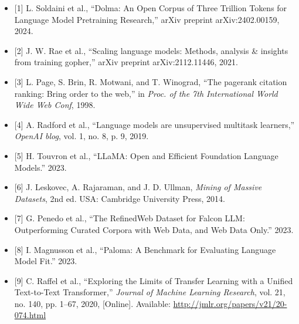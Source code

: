 \begin{itemize}
  \item {[1]} L. Soldaini et al., ``Dolma: An Open Corpus of Three Trillion Tokens for Language Model Pretraining Research,'' arXiv preprint arXiv:2402.00159, 2024.
  \item {[2]} J. W. Rae et al., ``Scaling language models: Methods, analysis \& insights from training gopher,'' arXiv preprint arXiv:2112.11446, 2021.
  \item {[3]} L. Page, S. Brin, R. Motwani, and T. Winograd, ``The pagerank citation ranking: Bring order to the web,'' in \textit{Proc. of the 7th International World Wide Web Conf}, 1998.
  \item {[4]} A. Radford et al., ``Language models are unsupervised multitask learners,'' \textit{OpenAI blog}, vol. 1, no. 8, p. 9, 2019.
  \item {[5]} H. Touvron et al., ``LLaMA: Open and Efficient Foundation Language Models.'' 2023.
  \item {[6]} J. Leskovec, A. Rajaraman, and J. D. Ullman, \textit{Mining of Massive Datasets}, 2nd ed. USA: Cambridge University Press, 2014.
  \item {[7]} G. Penedo et al., ``The RefinedWeb Dataset for Falcon LLM: Outperforming Curated Corpora with Web Data, and Web Data Only.'' 2023.
  \item {[8]} I. Magnusson et al., ``Paloma: A Benchmark for Evaluating Language Model Fit.'' 2023.
  \item {[9]} C. Raffel et al., ``Exploring the Limits of Transfer Learning with a Unified Text-to-Text Transformer,'' \textit{Journal of Machine Learning Research}, vol. 21, no. 140, pp. 1--67, 2020, [Online]. Available: \url{http://jmlr.org/papers/v21/20-074.html}
\end{itemize}
